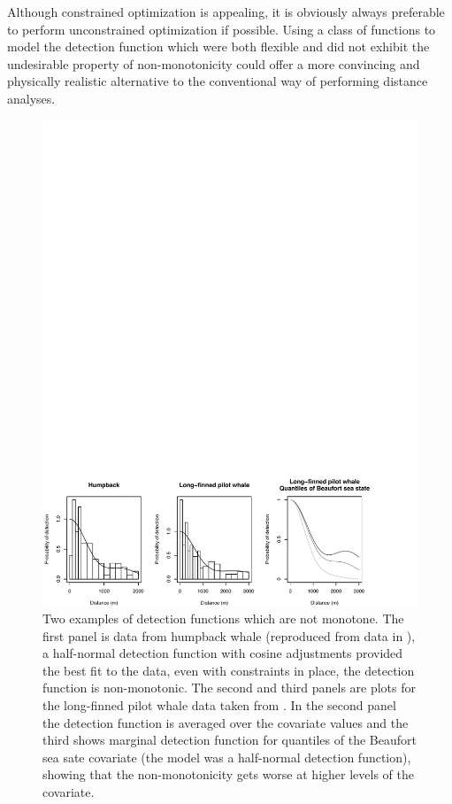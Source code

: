Although constrained optimization is appealing, it is obviously always preferable to perform unconstrained optimization if possible. Using a class of functions to model the detection function which were both flexible and did not exhibit the undesirable property of non-monotonicity could offer a more  convincing and physically realistic alternative to the conventional way of performing distance analyses.

\begin{figure}
\centering
\includegraphics[width=\textwidth]{mix/figs/figure1.pdf}
\caption{Two examples of detection functions which are not monotone. The first panel is data from humpback whale (reproduced from data in ), a half-normal detection function with cosine adjustments provided the best fit to the data, even with constraints in place, the detection function is non-monotonic. The second and third panels are plots for the long-finned pilot whale data taken from \cite{pike}. In the second panel the detection function is averaged over the covariate values and the third shows marginal detection function for quantiles of the Beaufort sea sate covariate (the model was a half-normal detection function), showing that the non-monotonicity gets worse at higher levels of the covariate.}
\label{fig1}
\end{figure}

